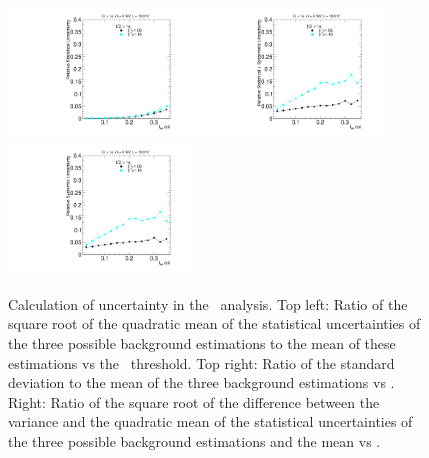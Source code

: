 \begin{figure}
 \begin{center}
 \includegraphics[clip=true, trim=0.0cm 0cm 3.0cm 0cm,width=0.44\textwidth]{figures/multi/Data8TeVCollisionStat}
 \includegraphics[clip=true, trim=0.0cm 0cm 3.0cm 0cm,width=0.44\textwidth]{figures/multi/Data8TeVCollisionStatSyst} \\
 \includegraphics[clip=true, trim=0.0cm 0cm 3.0cm 0cm,width=0.44\textwidth]{figures/multi/Data8TeVCollisionSyst}
\end{center}
\caption[Statistical and systematic uncertainty in the background prediction for different sets of thresholds in the \multi\ analysis]
{
Calculation of uncertainty in the \multi\ analysis.
Top left: Ratio of the square root of the quadratic
mean of the statistical uncertainties of the three possible background
estimations to the mean of these estimations vs
the \ias\ threshold. Top right: Ratio of the standard deviation to the mean of the three
background estimations vs \ias. Right: Ratio of the
square root of the difference between the variance and the quadratic
mean of the statistical uncertainties  of the three possible background
estimations and the mean vs \ias.
}
\label{fig:mCHAMPcorr2}
\end{figure}

